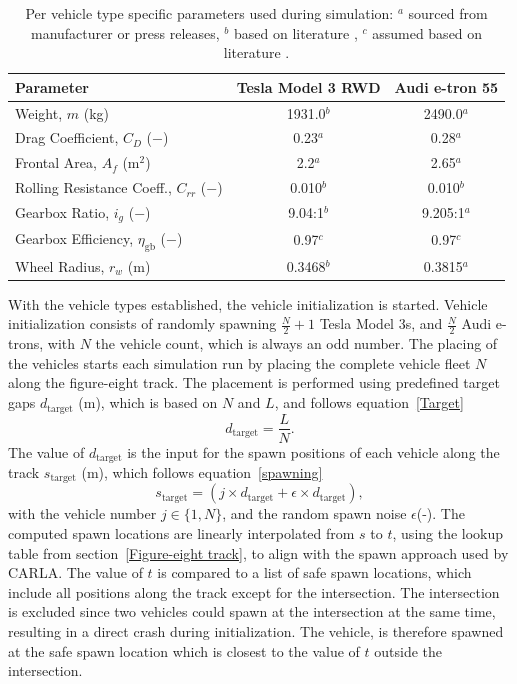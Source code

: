\begin{table}[H]
\centering
\caption{Per vehicle type specific parameters used during simulation: $^a$ sourced from manufacturer or press releases, $^b$ based on literature \parencite{swieczko2017tyre,rosenberger2024quantifying}, $^c$ assumed based on literature \parencite{lacock2023electric}.}
\begin{tabular}{lcc}

\toprule
\textbf{Parameter} & \textbf{Tesla Model 3 RWD} & \textbf{Audi e-tron 55} \\
\midrule
Weight, $m$ (kg) & 1931.0$^b$ & 2490.0$^a$ \\
Drag Coefficient, $C_D$ ($-$) & 0.23$^a$ & 0.28$^a$ \\
Frontal Area, $A_f$ ($\text{m}^2$) & 2.2$^a$ & 2.65$^a$ \\
Rolling Resistance Coeff., $C_{rr}$ ($-$) & 0.010$^b$ & 0.010$^b$ \\
Gearbox Ratio, $i_g$ ($-$) & 9.04:1$^b$ & 9.205:1$^a$ \\
Gearbox Efficiency, $\eta_{\text{gb}}$ ($-$) & 0.97$^c$ & 0.97$^c$ \\
Wheel Radius, $r_w$ (m) & 0.3468$^b$ & 0.3815$^a$ \\
\bottomrule
\end{tabular}
\label{vehicle specs}
\end{table}
With the vehicle types established, the vehicle initialization is started. Vehicle initialization consists of randomly spawning \(\frac{N}{2}+1\) Tesla Model 3s, and \(\frac{N}{2}\) Audi e-trons, with \(N\) the vehicle count, which is always an odd number. The placing of the vehicles starts each simulation run by placing the complete vehicle fleet \(N\) along the figure-eight track. The placement is performed using predefined target gaps \(d_\text{target}\) (m),  which is based on \(N\) and \(L\), and follows equation~\ref{Target} 
\begin{equation}
\label{Target}
    d_\text{target} = \frac{L}{N}.
\end{equation} The value of \(d_\text{target}\) is the input for the spawn positions of each vehicle along the track \(s_\text{target}\) (m), which follows equation~\ref{spawning}
\begin{equation}
\label{spawning}
    s_\text{target} = (j \times d_\text{target} + \epsilon\times d_\text{target}),
\end{equation}
with the vehicle number \(j\in\{1,N\}\), and the random spawn noise \(\epsilon\)(-). The computed spawn locations are linearly interpolated from \(s\) to \(t\), using the lookup table from section~\ref{Figure-eight track}, to align with the spawn approach used by CARLA. The value of \(t\) is compared to a list of safe spawn locations, which include all positions along the track except for the intersection. The intersection is excluded since two vehicles could spawn at the intersection at the same time, resulting in a direct crash during initialization. The vehicle, is therefore spawned at the safe spawn location which is closest to the value of \(t\) outside the intersection.

